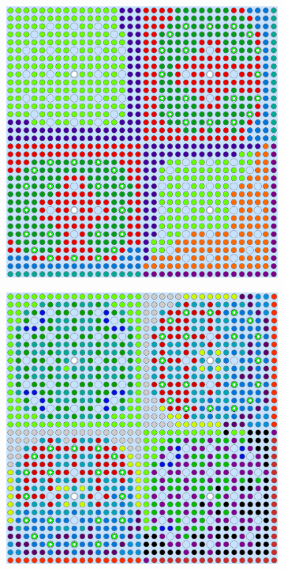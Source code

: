 \begin{figure}[h!]
\begin{subfigure}{0.47\textwidth}
  \caption{}
  \label{fig:chap10-reflector-pinch-4}
\end{subfigure}%
\begin{subfigure}{0.47\textwidth}
  \centering
  \includegraphics[width=0.9\linewidth]{figures/unsupervised/geometries/with-features/4-clusters/combined/reflector}
  \caption{}
  \label{fig:chap10-reflector-combined-4}
\end{subfigure}
\begin{subfigure}{0.47\textwidth}
  \centering
  \includegraphics[width=0.9\linewidth]{figures/unsupervised/geometries/with-features/8-clusters/pinch/reflector}

\end{subfigure}
\end{figure}
